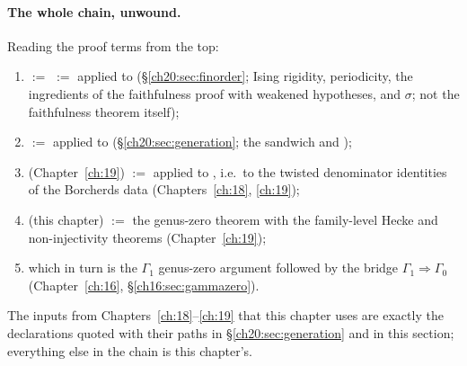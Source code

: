 \paragraph{The whole chain, unwound.}  Reading the proof terms from the top:
\begin{enumerate}[label=(\arabic*)]
\item {} $:=$  $:=$  applied to
   (\S\ref{ch20:sec:finorder}; Ising rigidity, periodicity, the ingredients of the faithfulness
  proof with weakened hypotheses, and $\sigma$; not the faithfulness theorem itself);
\item {} $:=$  applied to
   (\S\ref{ch20:sec:generation}; the sandwich and );
\item {} (Chapter~\ref{ch:19}) $:=$
   applied to ,
  i.e.\ to the twisted denominator identities of the Borcherds data  (Chapters~\ref{ch:18},
  \ref{ch:19});
\item {} (this chapter) $:=$ the genus-zero theorem
   with the family-level Hecke and non-injectivity theorems
  (Chapter~\ref{ch:19});
\item which in turn is the $\Gamma_1$ genus-zero argument followed by the bridge $\Gamma_1\Rightarrow\Gamma_0$
   (Chapter~\ref{ch:16}, \S\ref{ch16:sec:gammazero}).
\end{enumerate}
The inputs from Chapters~\ref{ch:18}--\ref{ch:19} that this chapter uses are exactly the declarations quoted with their
paths in \S\ref{ch20:sec:generation} and in this section; everything else in the chain is this chapter's.

